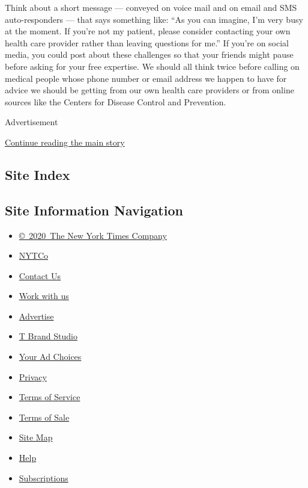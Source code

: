 Think about a short message --- conveyed on voice mail and on email and
SMS auto-responders --- that says something like: ``As you can imagine,
I'm very busy at the moment. If you're not my patient, please consider
contacting your own health care provider rather than leaving questions
for me.'' If you're on social media, you could post about these
challenges so that your friends might pause before asking for your free
expertise. We should all think twice before calling on medical people
whose phone number or email address we happen to have for advice we
should be getting from our own health care providers or from online
sources like the Centers for Disease Control and Prevention.

Advertisement

\protect\hyperlink{after-bottom}{Continue reading the main story}

\hypertarget{site-index}{%
\subsection{Site Index}\label{site-index}}

\hypertarget{site-information-navigation}{%
\subsection{Site Information
Navigation}\label{site-information-navigation}}

\begin{itemize}
\tightlist
\item
  \href{https://help.nytimes3xbfgragh.onion/hc/en-us/articles/115014792127-Copyright-notice}{©~2020~The
  New York Times Company}
\end{itemize}

\begin{itemize}
\tightlist
\item
  \href{https://www.nytco.com/}{NYTCo}
\item
  \href{https://help.nytimes3xbfgragh.onion/hc/en-us/articles/115015385887-Contact-Us}{Contact
  Us}
\item
  \href{https://www.nytco.com/careers/}{Work with us}
\item
  \href{https://nytmediakit.com/}{Advertise}
\item
  \href{http://www.tbrandstudio.com/}{T Brand Studio}
\item
  \href{https://www.nytimes3xbfgragh.onion/privacy/cookie-policy\#how-do-i-manage-trackers}{Your
  Ad Choices}
\item
  \href{https://www.nytimes3xbfgragh.onion/privacy}{Privacy}
\item
  \href{https://help.nytimes3xbfgragh.onion/hc/en-us/articles/115014893428-Terms-of-service}{Terms
  of Service}
\item
  \href{https://help.nytimes3xbfgragh.onion/hc/en-us/articles/115014893968-Terms-of-sale}{Terms
  of Sale}
\item
  \href{https://spiderbites.nytimes3xbfgragh.onion}{Site Map}
\item
  \href{https://help.nytimes3xbfgragh.onion/hc/en-us}{Help}
\item
  \href{https://www.nytimes3xbfgragh.onion/subscription?campaignId=37WXW}{Subscriptions}
\end{itemize}
